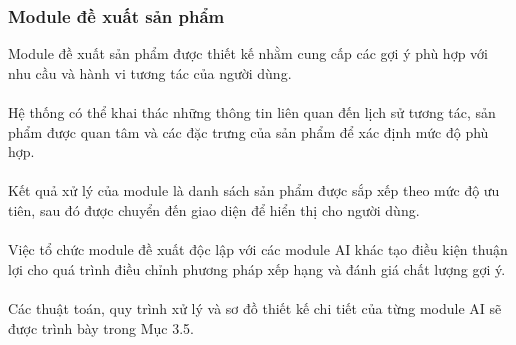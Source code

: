 \documentclass{report}
\begin{document}
\subsubsection{Module đề xuất sản phẩm}
Module đề xuất sản phẩm được thiết kế nhằm
cung cấp các gợi ý phù hợp với nhu cầu và
hành vi tương tác của người dùng.\\\\
Hệ thống có thể khai thác những thông tin
liên quan đến lịch sử tương tác, sản phẩm
được quan tâm và các đặc trưng của sản
phẩm để xác định mức độ phù hợp.\\\\
Kết quả xử lý của module là danh sách
sản phẩm được sắp xếp theo mức độ ưu
tiên, sau đó được chuyển đến giao diện
để hiển thị cho người dùng.\\\\
Việc tổ chức module đề xuất độc lập với
các module AI khác tạo điều kiện thuận
lợi cho quá trình điều chỉnh phương pháp
xếp hạng và đánh giá chất lượng gợi ý.\\\\
Các thuật toán, quy trình xử lý và sơ đồ
thiết kế chi tiết của từng module AI
sẽ được trình bày trong Mục 3.5.
\end{document}
